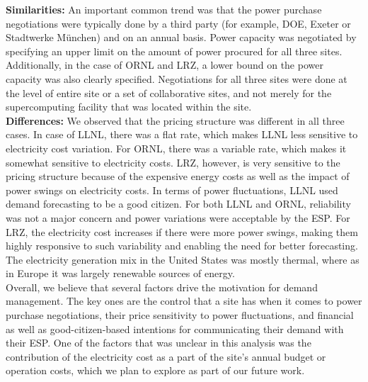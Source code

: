 {\bf Similarities:}
An important common trend was that the power purchase negotiations were typically done by a third party (for example, DOE, Exeter or Stadtwerke M{\"u}nchen) and on an annual basis. Power capacity was negotiated by specifying an upper limit on the amount of power procured for all three sites. Additionally, in the case of ORNL and LRZ, a lower bound on the power capacity was also clearly specified. Negotiations for all three sites were done at the level of entire site or a set of collaborative sites, and not merely for the supercomputing facility that was located within the site.\\

{\bf Differences:}
We observed that the pricing structure was different in all three cases. In case of LLNL, there was a flat rate, which makes LLNL less sensitive to electricity cost variation. For ORNL, there was a variable rate, which makes it somewhat sensitive to electricity costs. LRZ, however, is very sensitive to the pricing structure because of the expensive energy costs as well as the impact of power swings on electricity costs. In terms of power fluctuations, LLNL used demand forecasting to be a good citizen. For both LLNL and ORNL, reliability was not a major concern and power variations were acceptable by the ESP. For LRZ, the electricity cost increases if there were more power swings, making them highly responsive to such variability and enabling the need for better forecasting. The electricity generation mix in the United States was mostly thermal, where as in Europe it was largely renewable sources of energy. \\

Overall, we believe that several factors drive the motivation for demand management. The key ones are the control that a site has when it comes to power purchase negotiations, their price sensitivity to power fluctuations, and financial as well as good-citizen-based intentions for communicating their demand with their ESP.  One of the factors that was unclear in this analysis was the contribution of the electricity cost as a part of the site's annual budget or operation costs, which we plan to explore as part of our future work.